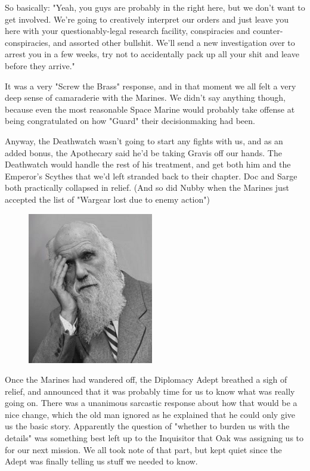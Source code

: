 So basically: 
"Yeah, you guys are probably in the right here, but we don't want to get involved. 
We're going to creatively interpret our orders and just leave you here with your questionably-legal research facility, conspiracies and counter-conspiracies, and assorted other bullshit. 
We'll send a new investigation over to arrest you in a few weeks, try not to accidentally pack up all your shit and leave before they arrive."

It was a very "Screw the Brass" response, and in that moment we all felt a very deep sense of camaraderie with the Marines. 
We didn't say anything though, because even the most reasonable Space Marine would probably take offense at being congratulated on how "Guard" their decisionmaking had been.

Anyway, the Deathwatch wasn't going to start any fights with us, and as an added bonus, the Apothecary said he'd be taking Gravis off our hands. 
The Deathwatch would handle the rest of his treatment, and get both him and the Emperor's Scythes that we'd left stranded back to their chapter. 
Doc and Sarge both practically collapsed in relief. 
(And so did Nubby when the Marines just accepted the list of "Wargear lost due to enemy action")

\begin{figure}
	\begin{center}
		\includegraphics[width=\figwidth]{pics/16/67.png}
	\end{center}
\end{figure}
Once the Marines had wandered off, the Diplomacy Adept breathed a sigh of relief, and announced that it was probably time for us to know what was really going on. 
There was a unanimous sarcastic response about how that would be a nice change, which the old man ignored as he explained that he could only give us the basic story. 
Apparently the question of "whether to burden us with the details" was something best left up to the Inquisitor that Oak was assigning us to for our next mission. 
We all took note of that part, but kept quiet since the Adept was finally telling us stuff we needed to know.

